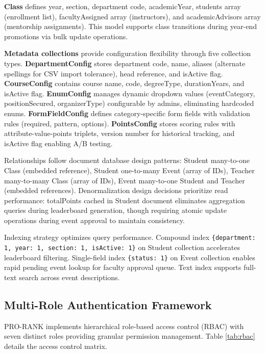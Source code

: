 \documentclass[conference]{IEEEtran}
\begin{document}
\textbf{Class} defines year, section, department code, academicYear, students array (enrollment list), facultyAssigned array (instructors), and academicAdvisors array (mentorship assignments). This model supports class transitions during year-end promotions via bulk update operations.

\textbf{Metadata collections} provide configuration flexibility through five collection types. \textbf{DepartmentConfig} stores department code, name, aliases (alternate spellings for CSV import tolerance), head reference, and isActive flag. \textbf{CourseConfig} contains course name, code, degreeType, durationYears, and isActive flag. \textbf{EnumConfig} manages dynamic dropdown values (eventCategory, positionSecured, organizerType) configurable by admins, eliminating hardcoded enums. \textbf{FormFieldConfig} defines category-specific form fields with validation rules (required, pattern, options). \textbf{PointsConfig} stores scoring rules with attribute-value-points triplets, version number for historical tracking, and isActive flag enabling A/B testing.

Relationships follow document database design patterns: Student many-to-one Class (embedded reference), Student one-to-many Event (array of IDs), Teacher many-to-many Class (array of IDs), Event many-to-one Student and Teacher (embedded references). Denormalization design decisions prioritize read performance: totalPoints cached in Student document eliminates aggregation queries during leaderboard generation, though requiring atomic update operations during event approval to maintain consistency.

Indexing strategy optimizes query performance. Compound index \texttt{\{department: 1, year: 1, section: 1, isActive: 1\}} on Student collection accelerates leaderboard filtering. Single-field index \texttt{\{status: 1\}} on Event collection enables rapid pending event lookup for faculty approval queue. Text index supports full-text search across event descriptions.

\subsection{Multi-Role Authentication Framework}
PRO-RANK implements hierarchical role-based access control (RBAC) with seven distinct roles providing granular permission management. Table \ref{tab:rbac} details the access control matrix.
\end{document}
